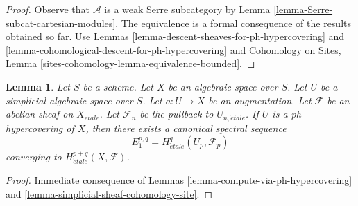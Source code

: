 \documentclass{stacks-project}
\theoremstyle{plain}
\newtheorem{lemma}[subsection]{Lemma}
\theoremstyle{definition}
\theoremstyle{remark}
\numberwithin{equation}{subsection}
\def\etale{{\acute{e}tale}}
\begin{document}
\begin{proof}
Observe that $\mathcal{A}$ is a weak Serre subcategory by
Lemma \ref{lemma-Serre-subcat-cartesian-modules}.
The equivalence is a
formal consequence of the results obtained so far. Use
Lemmas \ref{lemma-descent-sheaves-for-ph-hypercovering} and
\ref{lemma-cohomological-descent-for-ph-hypercovering} and
Cohomology on Sites, Lemma \ref{sites-cohomology-lemma-equivalence-bounded}.
\end{proof}

\begin{lemma}
\label{lemma-spectral-sequence-ph-hypercovering}
Let $S$ be a scheme. Let $X$ be an algebraic space over $S$.
Let $U$ be a simplicial algebraic space over $S$. Let $a : U \to X$
be an augmentation. Let $\mathcal{F}$ be an abelian sheaf
on $X_\etale$. Let $\mathcal{F}_n$ be the pullback to $U_{n, \etale}$.
If $U$ is a ph hypercovering of $X$, then
there exists a canonical spectral sequence
$$
E_1^{p, q} = H^q_\etale(U_p, \mathcal{F}_p)
$$
converging to $H^{p + q}_\etale(X, \mathcal{F})$.
\end{lemma}

\begin{proof}
Immediate consequence of Lemmas \ref{lemma-compute-via-ph-hypercovering}
and \ref{lemma-simplicial-sheaf-cohomology-site}.
\end{proof}














\end{document}
